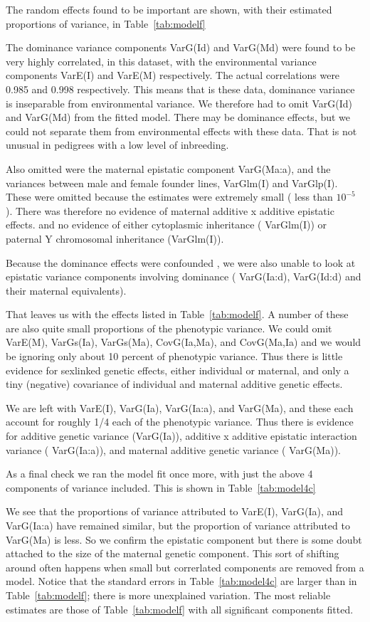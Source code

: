 \documentclass[titlepage]{article}  %
\begin{document}
The random effects found to be important are shown, with their estimated proportions of variance, in Table~\ref{tab:modelf}

The dominance variance components VarG(Id) and VarG(Md) were found to be very highly correlated, in this dataset, with the environmental variance components VarE(I) and VarE(M) respectively. The actual correlations were 0.985 and 0.998 respectively. This means that is these data, dominance variance is inseparable from environmental variance. We therefore had to omit VarG(Id) and VarG(Md) from the fitted model. There may be dominance effects, but we could not separate them from environmental effects with these data.  That is not unusual in pedigrees with a low level of inbreeding.

Also omitted were the  maternal epistatic component VarG(Ma:a), and the variances between male and female founder lines, VarGlm(I) and VarGlp(I). These were omitted because the estimates were extremely small ( less than $10^{-5}$ ). There was therefore no evidence of maternal additive x additive epistatic effects. and no evidence of either cytoplasmic inheritance ( VarGlm(I)) or paternal Y chromosomal inheritance (VarGlm(I)).

Because the dominance effects were confounded , we were also unable to look at epistatic variance components involving dominance ( VarG(Ia:d), VarG(Id:d) and their maternal equivalents). 

That leaves us with the effects listed in Table~\ref{tab:modelf}. A number of these are also quite small proportions of the phenotypic variance. We could omit VarE(M), VarGs(Ia), VarGs(Ma), CovG(Ia,Ma), and CovG(Ma,Ia) and we would be ignoring only about 10 percent of phenotypic variance. Thus there is little evidence for sexlinked genetic effects, either individual or maternal, and only a tiny (negative) covariance of individual and maternal additive genetic effects.

We are left with VarE(I), VarG(Ia), VarG(Ia:a), and VarG(Ma), and these each account for roughly 1/4 each of the phenotypic variance. Thus there is evidence for additive genetic variance (VarG(Ia)), additive x additive epistatic interaction variance ( VarG(Ia:a)), and maternal additive genetic variance ( VarG(Ma)). 

As a final check we ran the model fit once more, with just the above 4 components of variance included. This is shown in Table~\ref{tab:model4c}

We see that the proportions of variance attributed to VarE(I), VarG(Ia), and  VarG(Ia:a) have remained similar, but the proportion of variance attributed to VarG(Ma) is less.  So we confirm the epistatic component but there is some doubt attached to the size of the maternal genetic component.  This sort of shifting around often happens when small but correrlated components are removed from a model. Notice that the standard errors in Table~\ref{tab:model4c} are larger than in Table~\ref{tab:modelf}; there is more unexplained variation. The most reliable estimates are those of Table~\ref{tab:modelf} with all significant components fitted. 
\end{document}
